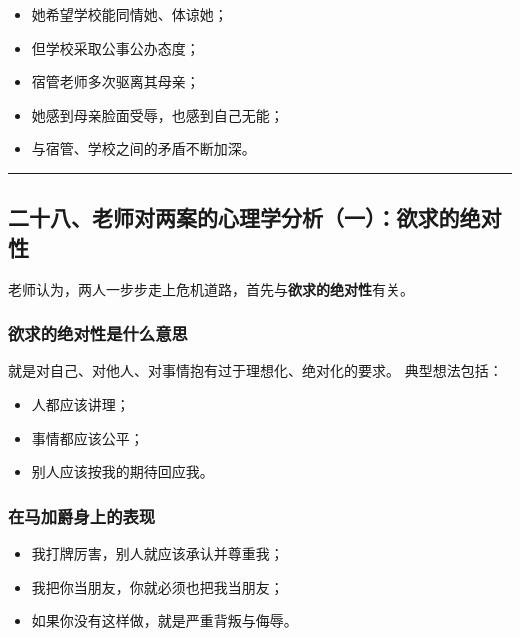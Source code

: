 \documentclass[
  chinese,
  9pt,
  a4paper,
]{ctexart}
\providecommand{\tightlist}{%
  \setlength{\itemsep}{0pt}\setlength{\parskip}{0pt}}
\begin{document}
\begin{itemize}
\tightlist
\item
  她希望学校能同情她、体谅她；
\item
  但学校采取公事公办态度；
\item
  宿管老师多次驱离其母亲；
\item
  她感到母亲脸面受辱，也感到自己无能；
\item
  与宿管、学校之间的矛盾不断加深。
\end{itemize}

\begin{center}\rule{0.5\linewidth}{0.5pt}\end{center}

\subsection{二十八、老师对两案的心理学分析（一）：欲求的绝对性}\label{ux4e8cux5341ux516bux8001ux5e08ux5bf9ux4e24ux6848ux7684ux5fc3ux7406ux5b66ux5206ux6790ux4e00ux6b32ux6c42ux7684ux7eddux5bf9ux6027}

老师认为，两人一步步走上危机道路，首先与\textbf{欲求的绝对性}有关。

\subsubsection{欲求的绝对性是什么意思}\label{ux6b32ux6c42ux7684ux7eddux5bf9ux6027ux662fux4ec0ux4e48ux610fux601d}

就是对自己、对他人、对事情抱有过于理想化、绝对化的要求。 典型想法包括：

\begin{itemize}
\tightlist
\item
  人都应该讲理；
\item
  事情都应该公平；
\item
  别人应该按我的期待回应我。
\end{itemize}

\subsubsection{在马加爵身上的表现}\label{ux5728ux9a6cux52a0ux7235ux8eabux4e0aux7684ux8868ux73b0}

\begin{itemize}
\tightlist
\item
  我打牌厉害，别人就应该承认并尊重我；
\item
  我把你当朋友，你就必须也把我当朋友；
\item
  如果你没有这样做，就是严重背叛与侮辱。
\end{itemize}
\end{document}
